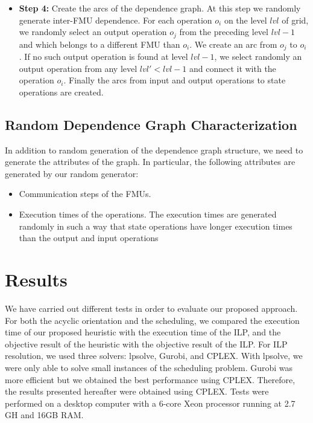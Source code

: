 \begin{itemize}
\begin{enumerate}
\end{enumerate}
\item \textbf{Step 4:} Create the arcs of the dependence graph. At this step we randomly generate inter-FMU dependence. For each operation $o_i$ on the level $lvl$ of grid, we randomly select an output operation $o_j$ from the preceding level $lvl-1$ and which belongs to a different FMU than $o_i$. We create an arc from $o_j$ to $o_i$. If no such output operation is found at level $lvl-1$, we select randomly an output operation from any level $lvl' < lvl-1$ and connect it with the operation $o_i$. Finally the arcs from input and output operations to state operations are created. 
\end{itemize}

\subsection{Random Dependence Graph Characterization}

In addition to random generation of the dependence graph structure, we need to generate the attributes of the graph. In particular, the following attributes are generated by our random generator:
\begin{itemize}
\item Communication steps of the FMUs.
\item Execution times of the operations. The execution times are generated randomly in such a way that state operations have longer execution times than the output and input operations
\end{itemize}

\section{Results}

We have carried out different tests in order to evaluate our proposed approach. For both the acyclic orientation and the scheduling, we compared the execution time of our proposed heuristic with the execution time of the ILP, and the objective result of the heuristic with the objective result of the ILP. For ILP resolution, we used three solvers: lpsolve, Gurobi, and CPLEX. With lpsolve, we were only able to solve small instances of the scheduling problem. Gurobi was more efficient but we obtained the best performance using CPLEX. Therefore, the results presented hereafter were obtained using CPLEX. %
Tests were performed on a desktop computer with a 6-core Xeon processor running at 2.7 GH and 16GB RAM.

